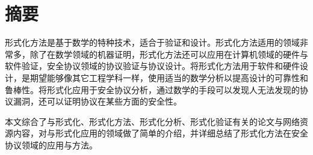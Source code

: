 
\section*{ \centering \textbf{摘要} }

形式化方法是基于数学的特种技术，适合于验证和设计。形式化方法适用的领域非常多，除了在数学领域的机器证明，形式化方法还可以应用在计算机领域的硬件与软件验证，安全协议领域的协议验证与协议设计。将形式化方法用于软件和硬件设计，是期望能够像其它工程学科一样，使用适当的数学分析以提高设计的可靠性和鲁棒性。将形式化应用于安全协议分析，通过数学的手段可以发现人无法发现的协议漏洞，还可以证明协议在某些方面的安全性。

本文综合了与形式化、形式化方法、形式化分析、形式化验证有关的论文与网络资源内容，对与形式化应用的领域做了简单的介绍，并详细总结了形式化方法在安全协议领域的应用与方法。






